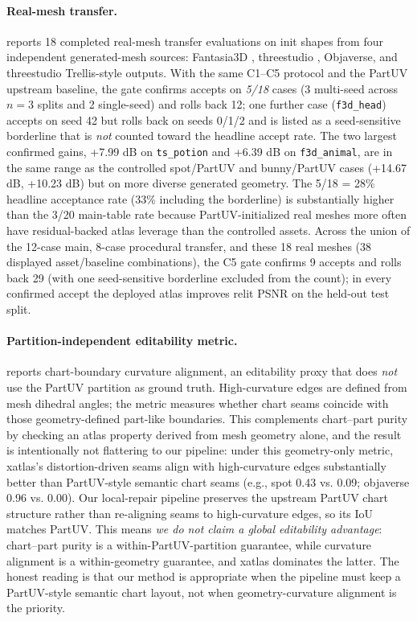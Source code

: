 \paragraph*{Real-mesh transfer.}

 reports 18 completed real-mesh transfer evaluations on init shapes from four independent generated-mesh sources: Fantasia3D \cite{chen2023fantasia3d}, threestudio \cite{guo2023threestudio}, Objaverse, and threestudio Trellis-style outputs. With the same C1--C5 protocol and the PartUV upstream baseline, the gate confirms accepts on \emph{5/18} cases (3 multi-seed across $n=3$ splits and 2 single-seed) and rolls back 12; one further case (\texttt{f3d\_head}) accepts on seed 42 but rolls back on seeds 0/1/2 and is listed as a seed-sensitive borderline that is \emph{not} counted toward the headline accept rate. The two largest confirmed gains, +7.99 dB on \texttt{ts\_potion} and +6.39 dB on \texttt{f3d\_animal}, are in the same range as the controlled spot/PartUV and bunny/PartUV cases (+14.67 dB, +10.23 dB) but on more diverse generated geometry. The 5/18 = 28\% headline acceptance rate (33\% including the borderline) is substantially higher than the 3/20 main-table rate because PartUV-initialized real meshes more often have residual-backed atlas leverage than the controlled assets. Across the union of the 12-case main, 8-case procedural transfer, and these 18 real meshes (38 displayed asset/baseline combinations), the C5 gate confirms 9 accepts and rolls back 29 (with one seed-sensitive borderline excluded from the count); in every confirmed accept the deployed atlas improves relit PSNR on the held-out test split.

\paragraph*{Partition-independent editability metric.}

 reports chart-boundary curvature alignment, an editability proxy that does \emph{not} use the PartUV partition as ground truth. High-curvature edges are defined from mesh dihedral angles; the metric measures whether chart seams coincide with those geometry-defined part-like boundaries. This complements chart--part purity by checking an atlas property derived from mesh geometry alone, and the result is intentionally not flattering to our pipeline: under this geometry-only metric, xatlas's distortion-driven seams align with high-curvature edges substantially better than PartUV-style semantic chart seams (e.g., spot 0.43 vs. 0.09; objaverse 0.96 vs. 0.00). Our local-repair pipeline preserves the upstream PartUV chart structure rather than re-aligning seams to high-curvature edges, so its IoU matches PartUV. This means \emph{we do not claim a global editability advantage}: chart--part purity is a within-PartUV-partition guarantee, while curvature alignment is a within-geometry guarantee, and xatlas dominates the latter. The honest reading is that our method is appropriate when the pipeline must keep a PartUV-style semantic chart layout, not when geometry-curvature alignment is the priority.

